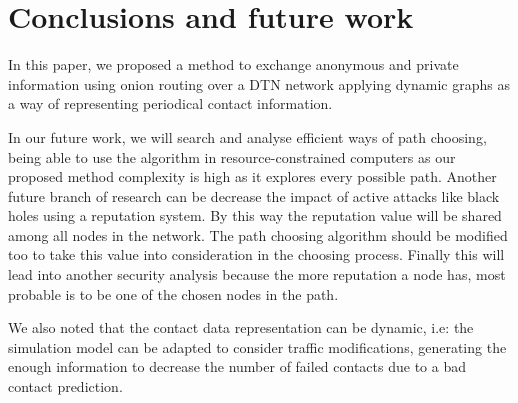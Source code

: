 \section{Conclusions and future work}\label{sec:conclusions}

In this paper, we proposed a method to  exchange anonymous and private information using onion routing over a DTN network applying dynamic graphs as a way of representing periodical contact information.


In our future work, we will search and analyse efficient ways of path choosing, being able to use the algorithm in resource-constrained computers as our proposed method complexity is high as it explores every possible path. Another future branch of research can be decrease the impact of active attacks like black holes using a reputation system. By this way the reputation value will be shared among all nodes in the network. The path choosing algorithm should be modified too to take this value into consideration in the choosing process. Finally this will lead into another security analysis because the more reputation a node has, most probable is to be one of the chosen nodes in the path.

We also noted that the contact data representation can be dynamic, i.e: the simulation model can be adapted to consider traffic modifications, generating the enough information to decrease the number of  failed contacts due to a bad contact prediction.